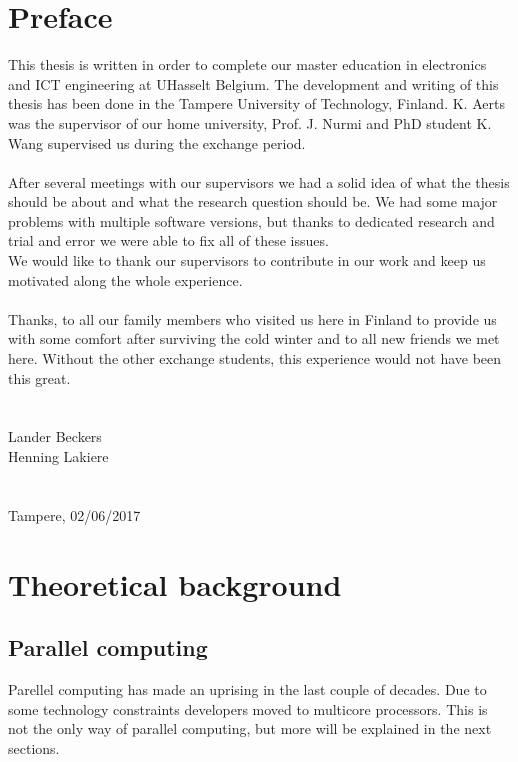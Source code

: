 \documentclass[a4paper, 11pt]{report}
\begin{document}
\chapter*{Preface}

This thesis is written in order to complete our master education in electronics and ICT engineering at UHasselt Belgium. The development and writing of this thesis has been done in the Tampere University of Technology, Finland. K. Aerts was the supervisor of our home university, Prof. J. Nurmi and PhD student K. Wang supervised us during the exchange period. \\\\
After several meetings with our supervisors we had a solid idea of what the thesis should be about and what the research question should be. We had some major problems with multiple software versions,  but thanks to dedicated research and trial and error we were able to fix all of these issues.\\
We would like to thank our supervisors to contribute in our work and keep us motivated along the whole experience.\\\\
Thanks, to all our family members who visited us here in Finland to provide us with some comfort after surviving the cold winter and to all new friends we met here. Without the other exchange students, this experience would not have been this great.\\\\\\
Lander Beckers\\
Henning Lakiere\\\\\\
Tampere, 02/06/2017


\chapter{Theoretical background}

\section{Parallel computing}
Parellel computing has made an uprising in the last couple of decades. Due to some technology constraints developers moved to multicore processors. This is not the only way of parallel computing, but more will be explained in the next sections.
\end{document}
